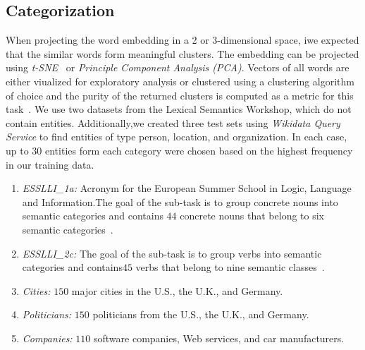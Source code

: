 \subsection{Categorization}
When projecting the word embedding in a 2 or 3-dimensional space, iwe expected that the similar words form meaningful clusters. The embedding can be projected using \emph{t-SNE}~ or \emph{Principle Component Analysis (PCA)}. Vectors of all words are either viualized for exploratory analysis or clustered using a clustering algorithm of choice and the purity of the returned clusters is computed as a metric for this task~. We use two datasets from the Lexical Semantics Workshop, which do not contain entities. Additionally,we created three test sets using \emph{Wikidata Query Service} to find entities of type person, location, and organization. In each case, up to $30$ entities form each category were chosen based on the highest frequency in our training data. 
\begin{enumerate}
  \item \emph{ESSLLI\_1a:} Acronym for the European Summer School in Logic, Language
and Information.The goal of the sub-task is to group concrete nouns into semantic categories and contains $44$ concrete nouns that belong to six semantic categories~\cite{SCHO:workshop/Baroni}. 
  \item \emph{ESSLLI\_2c:} The goal of the sub-task is to group verbs into semantic categories and contains$45$ verbs that belong to nine semantic classes~\cite{SCHO:workshop/Baroni}.
  \item \emph{Cities:} $150$ major cities in the U.S., the U.K., and Germany. 
  \item \emph{Politicians:} $150$ politicians from the U.S., the U.K., and Germany.
  \item \emph{Companies:} $110$ software companies, Web services, and car manufacturers. 
\end{enumerate}

